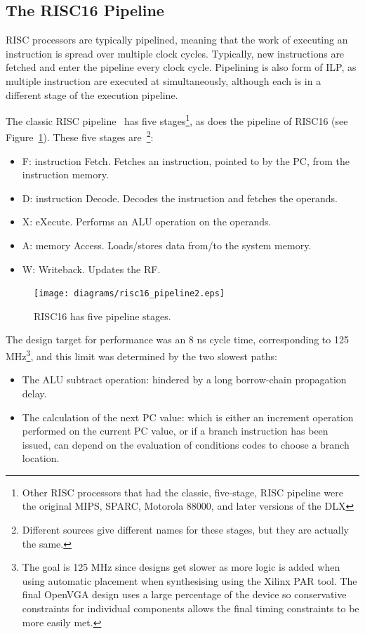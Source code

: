 \subsection{The RISC16 Pipeline}
RISC processors are typically pipelined, meaning that the work of executing an
instruction is spread over multiple clock cycles. Typically, new instructions are
fetched and enter the pipeline every clock cycle. Pipelining is also form of ILP,
as multiple instruction are executed at simultaneously, although each is in a
different stage of the execution pipeline.

The classic RISC pipeline~\cite{smith1994paa} has five stages\footnote{Other RISC
processors that had the classic, five-stage, RISC pipeline were the original
MIPS, SPARC, Motorola 88000, and later versions of the DLX\cite{smith1994paa}},
as does the pipeline of RISC16 (see Figure~\ref{RISC16_Pipeline}). These five
stages are~\cite{Comp_Arch}\footnote{Different sources give different names for
these stages, but they are actually the same.}:
\begin{itemize}
  \item F: instruction Fetch. Fetches an instruction, pointed to by the PC, from
  the instruction memory.
  \item D: instruction Decode. Decodes the instruction and fetches the operands.
  \item X: eXecute. Performs an ALU operation on the operands.
  \item A: memory Access. Loads/stores data from/to the system memory.
  \item W: Writeback. Updates the RF.
\end{itemize}

\begin{figure}[h!]
\begin{center}
\texttt{[image: diagrams/risc16\_pipeline2.eps]}
\caption[RISC16 pipeline]{RISC16 has five pipeline stages.}
\label{RISC16_Pipeline}
\end{center}
\end{figure}

The design target for performance was an 8 ns cycle time, corresponding to 125
MHz\footnote{The goal is 125 MHz since designs get slower as more logic is
added when using automatic placement when synthesising using the Xilinx PAR
tool. The final OpenVGA design uses a large percentage of the device so
conservative constraints for individual components allows the final timing
constraints to be more easily met.}, and this limit was determined by the two
slowest paths:
\begin{itemize}
  \item The ALU subtract operation: hindered by a long borrow-chain propagation
  delay.
  \item The calculation of the next PC value: which is either an
  increment operation performed on the current PC value, or if a branch
  instruction has been issued, can depend on the evaluation of conditions codes
  to choose a branch location.
\end{itemize}

